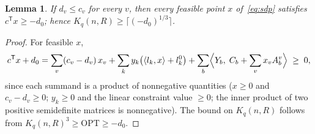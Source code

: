 \documentclass[10pt,a4paper]{amsart}
\newtheorem{lemma}{Lemma}
\begin{document}
\begin{lemma}\label{lem:cert}
If $d_v\le c_v$ for every $v$, then every feasible point $x$
of~\eqref{eq:sdp} satisfies $c^{\mathsf T}x\ge -d_0$; hence
$K_q(n,R)\ge\bigl\lceil(-d_0)^{1/3}\bigr\rceil$.
\end{lemma}

\begin{proof}
For feasible $x$,
\[
c^{\mathsf T}x + d_0
= \sum_v (c_v-d_v)\,x_v
+ \sum_k y_k\bigl(\langle l_k,x\rangle + l_k^0\bigr)
+ \sum_b \Bigl\langle Y_b,\; C_b+\sum_v x_v A_b^v\Bigr\rangle
\;\ge\; 0,
\]
since each summand is a product of nonnegative quantities ($x\ge 0$ and
$c_v-d_v\ge 0$; $y_k\ge 0$ and the linear constraint value $\ge 0$; the
inner product of two positive semidefinite matrices is nonnegative). The
bound on $K_q(n,R)$ follows from $K_q(n,R)^3\ge\mathrm{OPT}\ge -d_0$.
\end{proof}
\end{document}
